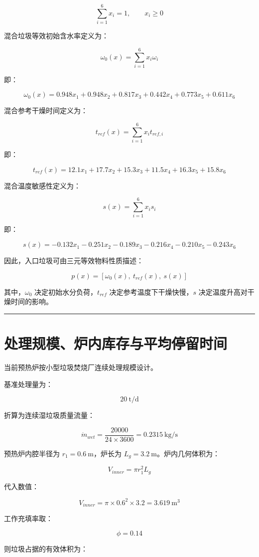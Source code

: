\documentclass[UTF8,openany,zihao=-4,oneside]{ctexbook}
\newcommand{\manualdivider}{\par\vspace{0.6em}\noindent\textcolor{FGLine}{\rule{\linewidth}{0.7pt}}\vspace{0.6em}\par}
\begin{document}
\[
\sum_{i=1}^{6}x_i=1,\qquad x_i\ge0
\]

混合垃圾等效初始含水率定义为：

\[
\omega_0(x)=\sum_{i=1}^{6}x_i\omega_i
\]

即：

\[
\omega_0(x)=0.948x_1+0.948x_2+0.817x_3+0.442x_4+0.773x_5+0.611x_6
\]

混合参考干燥时间定义为：

\[
t_{ref}(x)=\sum_{i=1}^{6}x_it_{ref,i}
\]

即：

\[
t_{ref}(x)=12.1x_1+17.7x_2+15.3x_3+11.5x_4+16.3x_5+15.8x_6
\]

混合温度敏感性定义为：

\[
s(x)=\sum_{i=1}^{6}x_is_i
\]

即：

\[
s(x)=-0.132x_1-0.251x_2-0.189x_3-0.216x_4-0.210x_5-0.243x_6
\]

因此，入口垃圾可由三元等效物料性质描述：

\[
p(x)=\left[\omega_0(x),\ t_{ref}(x),\ s(x)\right]
\]

其中，\(\omega_0\) 决定初始水分负荷，\(t_{ref}\) 决定参考温度下干燥快慢，\(s\) 决定温度升高对干燥时间的影响。

\manualdivider

\section{处理规模、炉内库存与平均停留时间}\label{ux5904ux7406ux89c4ux6a21ux7089ux5185ux5e93ux5b58ux4e0eux5e73ux5747ux505cux7559ux65f6ux95f4}

当前预热炉按小型垃圾焚烧厂连续处理规模设计。

基准处理量为：

\[
20\ \mathrm{t/d}
\]

折算为连续湿垃圾质量流量：

\[
\dot m_{wet}=\frac{20000}{24\times3600}=0.2315\ \mathrm{kg/s}
\]

预热炉内腔半径为 \(r_1=0.6\ \mathrm{m}\)，炉长为 \(L_g=3.2\ \mathrm{m}\)。炉内几何体积为：

\[
V_{inner}=\pi r_1^2L_g
\]

代入数值：

\[
V_{inner}=\pi\times0.6^2\times3.2=3.619\ \mathrm{m^3}
\]

工作充填率取：

\[
\phi=0.14
\]

则垃圾占据的有效体积为：
\end{document}
